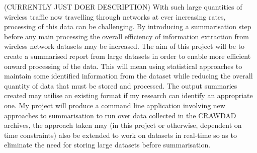 (CURRENTLY JUST DOER DESCRIPTION)
With such large quantities of wireless traffic now travelling through networks at ever increasing rates, processing of this data can be challenging. By introducing a summarisation step before any main processing the overall efficiency of information extraction from wireless network datasets may be increased. The aim of this project will be to create a summarised report from large datasets in order to enable more efficient onward processing of the data. This will mean using statistical approaches to maintain some identified information from the dataset while reducing the overall quantity of data that must be stored and processed. The output summaries created may utilise an existing format if my research can identify an appropriate one. My project will produce a command line application involving new approaches to summarisation to run over data collected in the CRAWDAD archives, the approach taken may (in this project or otherwise, dependent on time constraints) also be extended to work on datasets in real-time so as to eliminate the need for storing large datasets before summarisation.
